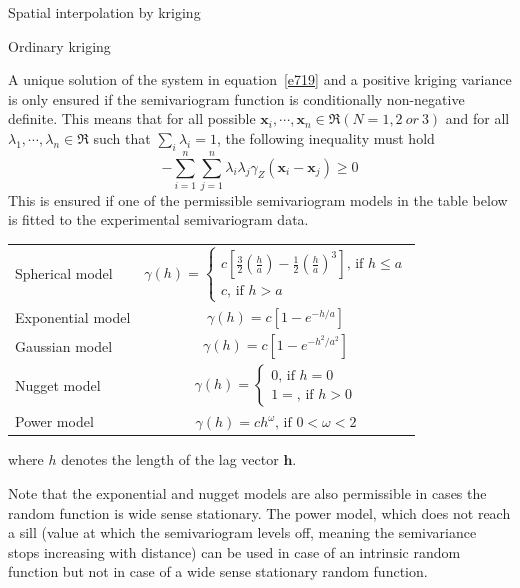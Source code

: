 \documentclass[8pt]{beamer}
\renewcommand{\emph}[1]{\textcolor{myorange}{#1}}
\begin{document}
 \begin{frame}{Spatial interpolation by kriging}
     \begin{block}{Ordinary kriging}
    \end{block}
    A unique solution of the system in equation~\ref{e719} and a positive \emph{kriging variance} is only ensured if the \emph{semivariogram function} is \emph{conditionally non-negative definite}. This means that for all possible $\mathbf{x}_i, \cdots, \mathbf{x}_n \in  \Re  (N=1,2\ or\ 3)$ and for all $\lambda_1, \cdots, \lambda_n \in \Re$ such that $\sum_i \lambda_i =1$, the following inequality must hold
    \vspace{-5pt}
    \begin{equation}
        -\sum_{i=1}^n \sum_{j=1}^n \lambda_i \lambda_j \gamma_Z (\mathbf{x}_i - \mathbf{x}_j) \geq 0
        \label{e721}
    \end{equation}
    This is ensured if one of the permissible \emph{semivariogram models} in the table below is fitted to the \emph{experimental semivariogram} data.
    \begin{center}
  \begin{tabular}{|l|c|}
    Spherical model         & $ \gamma (h) = \left\{ \begin{array}{l}  c \left[ \frac{3}{2}\left(\frac{h}{a}\right) - \frac{1}{2}\left(\frac{h}{a}\right)^3 \right]   \text{, if } h\leq a  \\ c  \text{, if } h > a \end{array} \right. $ \\ 
    Exponential model & $\gamma (h) = c \left[1- e^{-h/a} \right]$ \\ 
    Gaussian model         & $\gamma (h) =  c\left[1- e^{-h^2 / a^2} \right] $ \\ 
    Nugget model &  $ \gamma (h) = \left\{ \begin{array}{l}  0 \text{, if } h=0  \\ 1 = \text{, if } h>0 \end{array} \right. $ \\ 
    Power model & $\gamma (h) = ch^\omega \text{, if } 0<\omega<2 $
  \end{tabular}
    \end{center}
    where $h$ denotes the length of the lag vector $\mathbf{h}$.

    Note that the \emph{exponential and nugget} models are also permissible in cases the \emph{random function} is \emph{wide sense stationary}. The \emph{power model}, which does not reach a \emph{sill} (value at which the semivariogram levels off, meaning the semivariance stops increasing with distance) can be used in case of an intrinsic \emph{random function} but not in case of a wide sense stationary \emph{random function}.
 
   \end{frame}
\end{document}
